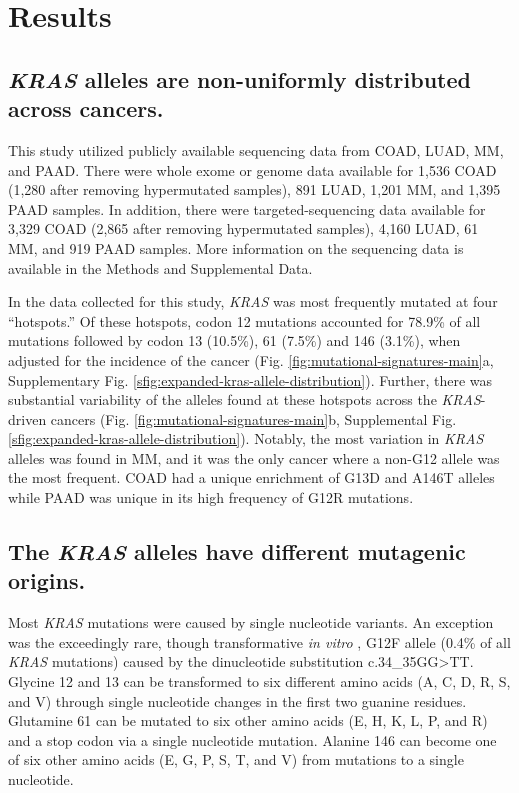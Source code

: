 \documentclass[english, 10pt, letterpaper]{article}
\newcommand{\KRAS}{\emph{KRAS}}
\begin{document}
\section*{Results}

\subsection*{\KRAS{} alleles are non-uniformly distributed across cancers.}

This study utilized publicly available sequencing data from COAD, LUAD, MM, and PAAD.
There were whole exome or genome data available for 1,536 COAD (1,280 after removing hypermutated samples), 891 LUAD, 1,201 MM, and 1,395 PAAD samples.
In addition, there were targeted-sequencing data available for 3,329 COAD (2,865 after removing hypermutated samples), 4,160 LUAD, 61 MM, and 919 PAAD samples.
More information on the sequencing data is available in the Methods and Supplemental Data.

In the data collected for this study, \KRAS{} was most frequently mutated at four “hotspots.” 
Of these hotspots, codon 12 mutations accounted for 78.9\% of all mutations followed by codon 13 (10.5\%), 61 (7.5\%) and 146 (3.1\%), when adjusted for the incidence of the cancer (Fig. \ref{fig:mutational-signatures-main}a, Supplementary Fig. \ref{sfig:expanded-kras-allele-distribution}).
Further, there was substantial variability of the alleles found at these hotspots across the \KRAS{}-driven cancers (Fig. \ref{fig:mutational-signatures-main}b, Supplemental Fig. \ref{sfig:expanded-kras-allele-distribution}). 
Notably, the most variation in \KRAS{} alleles was found in MM, and it was the only cancer where a non-G12 allele was the most frequent. 
COAD had a unique enrichment of G13D and A146T alleles while PAAD was unique in its high frequency of G12R mutations.


\subsection*{The \KRAS{} alleles have different mutagenic origins.}

Most \KRAS{} mutations were caused by single nucleotide variants.
An exception was the exceedingly rare, though transformative \emph{in vitro} \cite{Barbacid1987}, G12F allele (0.4\% of all \KRAS{} mutations) caused by the dinucleotide substitution c.34\_35GG>TT.
Glycine 12 and 13 can be transformed to six different amino acids (A, C, D, R, S, and V) through single nucleotide changes in the first two guanine residues.
Glutamine 61 can be mutated to six other amino acids (E, H, K, L, P, and R) and a stop codon via a single nucleotide mutation.
Alanine 146 can become one of six other amino acids (E, G, P, S, T, and V) from mutations to a single nucleotide.
\end{document}
